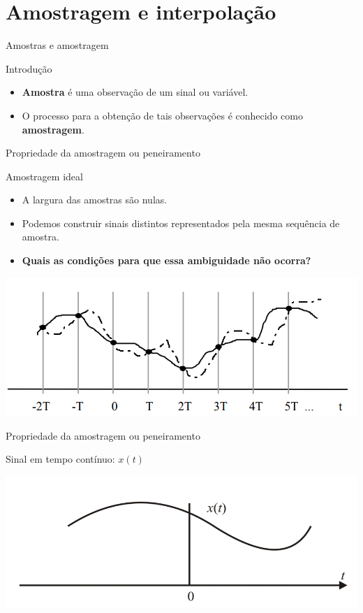 \section{Amostragem e interpolação}

\begin{frame}{Amostras e amostragem}
\begin{block}{Introdução}
\begin{itemize}
	\item \textbf{Amostra} é uma observação de um sinal ou variável.
	\item O processo para a obtenção de tais observações é conhecido como \textbf{amostragem}.
\end{itemize}
\end{block}
\end{frame}

\begin{frame}{Propriedade da amostragem ou peneiramento}
\begin{block}{Amostragem ideal}
\begin{itemize}
	\item A largura das amostras são nulas.
	\item Podemos construir sinais distintos representados pela mesma sequência de amostra.
	\item \textbf{Quais as condições para que essa ambiguidade não ocorra?}
\end{itemize}
\end{block}
\centerline{\includegraphics[width=0.9\linewidth]{Figuras/Ch02/fig3.PNG}}
\end{frame}

\begin{frame}{Propriedade da amostragem ou peneiramento}
\begin{block}{}
Sinal em tempo contínuo: $x(t)$
\end{block}
\centerline{\includegraphics[width=0.9\linewidth]{Figuras/Ch02/fig4.PNG}}
\end{frame}

